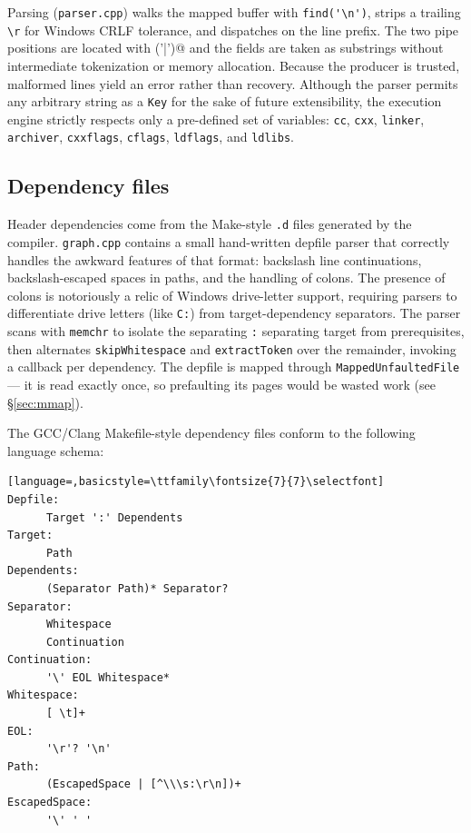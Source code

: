 \documentclass[11pt]{article}
\begin{document}
Parsing (\texttt{parser.cpp}) walks the mapped buffer with
\lstinline|find('\n')|, strips a trailing \lstinline|\r| for Windows CRLF
tolerance, and dispatches on the line prefix. The two pipe positions are located
with \lstinline@find('|')@ and the fields are taken as substrings without
intermediate tokenization or memory allocation. Because the producer is trusted,
malformed lines yield an error rather than recovery. Although the parser permits
any arbitrary string as a \texttt{Key} for the sake of future extensibility,
the execution engine strictly respects only a pre-defined set of variables:
\texttt{cc}, \texttt{cxx}, \texttt{linker}, \texttt{archiver},
\texttt{cxxflags}, \texttt{cflags}, \texttt{ldflags}, and \texttt{ldlibs}.

\subsection{Dependency files}

Header dependencies come from the Make-style \texttt{.d} files generated by the
compiler. \texttt{graph.cpp} contains a small hand-written depfile parser that
correctly handles the awkward features of that format: backslash line
continuations, backslash-escaped spaces in paths, and the handling of colons. The presence of colons is notoriously a relic of Windows drive-letter support, requiring parsers to differentiate drive letters (like \texttt{C:}) from target-dependency separators. The parser scans with
\lstinline|memchr| to isolate the separating \lstinline|:| separating target from
prerequisites, then alternates \lstinline|skipWhitespace| and
\lstinline|extractToken| over the remainder, invoking a callback per
dependency. The depfile is mapped through \lstinline|MappedUnfaultedFile| ---
it is read exactly once, so prefaulting its pages would be wasted work (see
\S\ref{sec:mmap}).

The GCC/Clang Makefile-style dependency files conform to the following language schema:

\begin{lstlisting}[language=,basicstyle=\ttfamily\fontsize{7}{7}\selectfont]
Depfile:
      Target ':' Dependents
Target:
      Path
Dependents:
      (Separator Path)* Separator?
Separator:
      Whitespace
      Continuation
Continuation:
      '\' EOL Whitespace*
Whitespace:
      [ \t]+
EOL:
      '\r'? '\n'
Path:
      (EscapedSpace | [^\\\s:\r\n])+
EscapedSpace:
      '\' ' '
\end{lstlisting}
\end{document}

